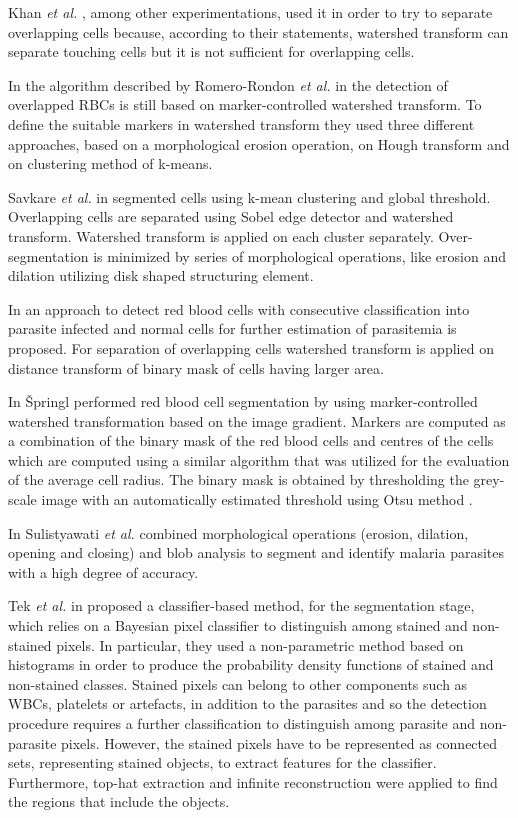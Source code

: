 \documentclass[sensors,review,submit,moreauthors,pdftex,10pt,a4paper]{mdpi}
\begin{document}
	Khan \emph{et al.} \cite{Khan2011}, among other experimentations, used it in order to try to separate overlapping cells because, according to their statements, watershed transform can separate touching cells but it is not sufficient for overlapping cells.
	
	In the algorithm described by Romero-Rondon \emph{et al.} in \cite{Romero2016} the detection of overlapped RBCs is still based on marker-controlled watershed transform. To define the suitable markers in watershed transform they used three different approaches, based on a morphological erosion operation, on Hough transform and on clustering method of k-means.
	
	Savkare \emph{et al.} in \cite{Savkare2015} segmented cells using k-mean clustering and global threshold. Overlapping cells are separated using Sobel edge detector and watershed transform. Watershed transform is applied on each cluster separately. Over-segmentation is minimized by series of morphological operations, like erosion and dilation utilizing disk shaped structuring element.
	
	In \cite{Savkare2011a} an approach  to detect red blood cells with consecutive classification into parasite infected and normal cells for further estimation of parasitemia is proposed. For separation of overlapping cells watershed transform is applied on distance transform of binary mask of cells having larger area.
	
	In \cite{Springl2009} {\v{S}}pringl performed red blood cell segmentation by using marker-controlled watershed transformation based on the image gradient. Markers are computed as a combination of the binary mask of the red blood cells and centres of the cells which are computed using a similar algorithm that was utilized for the evaluation of the average cell radius. The binary mask is obtained by thresholding the grey-scale image with an automatically estimated threshold using Otsu method \cite{Otsu1975}.
	
	In \cite{Sulist2015} Sulistyawati \emph{et al.} combined morphological operations (erosion, dilation, opening and closing) and blob analysis to segment and identify malaria parasites with a high degree of accuracy.
	
	Tek \emph{et al.} in \cite{Tek2006} proposed a classifier-based method, for the segmentation stage, which relies on a Bayesian pixel classifier to distinguish among stained and non-stained pixels. In particular, they used a non-parametric method based on histograms in order to produce the probability density functions of stained and non-stained classes. Stained pixels can belong to other components such as WBCs, platelets or artefacts, in addition to the parasites and so the detection procedure requires a further classification to distinguish among parasite and non-parasite pixels. However, the stained pixels have to be represented as connected sets, representing stained objects, to extract features for the classifier. Furthermore, top-hat extraction and infinite reconstruction were applied to find the regions that include the objects.
	
\end{document}
